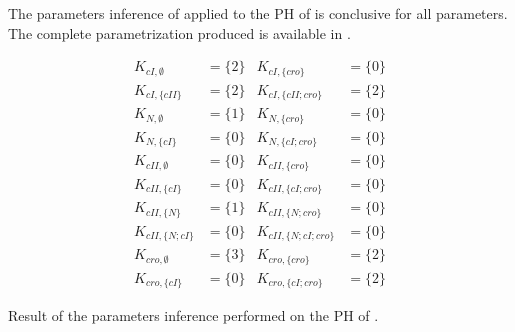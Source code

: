 \begin{example}
  The parameters inference of  applied to the PH of 
  is conclusive for all parameters.
  The complete parametrization produced is available in .
  \begin{table}[t]
  \begin{align*}
    K_{cI, \emptyset} &= \{2\} &
    K_{cI, \{cro\}} &= \{0\} \\
    K_{cI, \{cII\}} &= \{2\} &
    K_{cI, \{cII;cro\}} &= \{2\} \\
    K_{N, \emptyset} &= \{1\} &
    K_{N, \{cro\}} &= \{0\} \\
    K_{N, \{cI\}} &= \{0\} &
    K_{N, \{cI;cro\}} &= \{0\} \\
    K_{cII, \emptyset} &= \{0\} &
    K_{cII, \{cro\}} &= \{0\} \\
    K_{cII, \{cI\}} &= \{0\} &
    K_{cII, \{cI;cro\}} &= \{0\} \\
    K_{cII, \{N\}} &= \{1\} &
    K_{cII, \{N;cro\}} &= \{0\} \\
    K_{cII, \{N;cI\}} &= \{0\} &
    K_{cII, \{N;cI;cro\}} &= \{0\} \\
    K_{cro, \emptyset} &= \{3\} &
    K_{cro, \{cro\}} &= \{2\} \\
    K_{cro, \{cI\}} &= \{0\} &
    K_{cro, \{cI;cro\}} &= \{2\}
  \end{align*}
  \caption{\label{tb:phage-lambda-k}
    Result of the parameters inference performed on the PH of .
  }
  \end{table}
\end{example}
